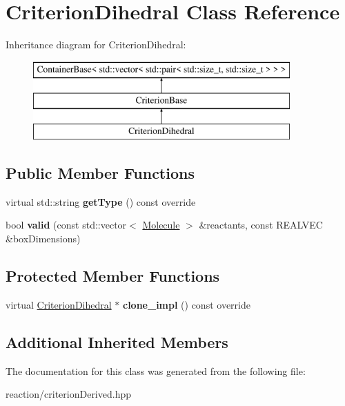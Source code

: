 \hypertarget{classCriterionDihedral}{}\section{Criterion\+Dihedral Class Reference}
\label{classCriterionDihedral}
Inheritance diagram for Criterion\+Dihedral\+:\begin{figure}[H]
\begin{center}
\leavevmode
\includegraphics[height=3.000000cm]{classCriterionDihedral}
\end{center}
\end{figure}
\subsection*{Public Member Functions}
\begin{DoxyCompactItemize}
\item 
\mbox{\label{classCriterionDihedral_a36631d04aa53d707c3f35ab1e55791d3}} 
virtual std\+::string {\bfseries get\+Type} () const override
\item 
\mbox{\label{classCriterionDihedral_a3790c79412e3a3f3a95ae5dfd3bd070c}} 
bool {\bfseries valid} (const std\+::vector$<$ \mbox{\hyperlink{classMolecule}{Molecule}} $>$ \&reactants, const R\+E\+A\+L\+V\+EC \&box\+Dimensions)
\end{DoxyCompactItemize}
\subsection*{Protected Member Functions}
\begin{DoxyCompactItemize}
\item 
\mbox{\label{classCriterionDihedral_a3b54f8c34e03a84ae42f0623fc4ed7df}} 
virtual \mbox{\hyperlink{classCriterionDihedral}{Criterion\+Dihedral}} $\ast$ {\bfseries clone\+\_\+impl} () const override
\end{DoxyCompactItemize}
\subsection*{Additional Inherited Members}


The documentation for this class was generated from the following file\+:\begin{DoxyCompactItemize}
\item 
reaction/criterion\+Derived.\+hpp\end{DoxyCompactItemize}
